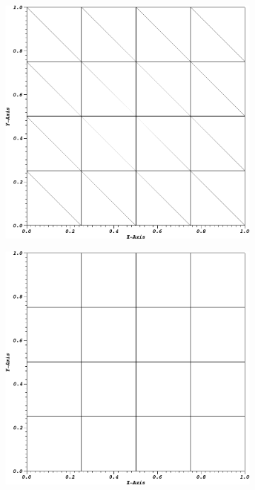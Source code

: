\begin{figure}
\centering
{
	\begin{subfigure}[b]{0.485\textwidth}
		\centering
		\label{subfig::PA_Mesh_Tri}
		\includegraphics[width=\textwidth]{figures/sec_BF/PAMesh_Tri.png}
	\end{subfigure}
	\hfill
	\begin{subfigure}[b]{0.485\textwidth}
		\centering
		\label{subfig::PA_Mesh_Cart}
		\includegraphics[width=\textwidth]{figures/sec_BF/PAMesh_Cart.png}

\end{subfigure}}
\end{figure}

